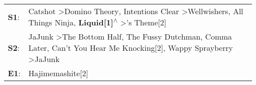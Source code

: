 \begin{supertabular}{p{0.03\textwidth}p{0.92\textwidth}}
 \textbf{S1}:  &  Catshot\textsuperscript{} \textgreater \enspace Domino Theory\textsuperscript{}, \enspace Intentions Clear\textsuperscript{} \textgreater \enspace Wellwishers\textsuperscript{}, \enspace All Things Ninja\textsuperscript{}, \enspace \textbf{Liquid[1]\textsuperscript{$\wedge$}} \textgreater {}'s Theme[2]\textsuperscript{}  \enspace  \\
 \textbf{S2}:  &               JaJunk\textsuperscript{} \textgreater \enspace The Bottom Half\textsuperscript{}, \enspace The Fussy Dutchman\textsuperscript{}, \enspace Comma Later\textsuperscript{}, \enspace Can't You Hear Me Knocking[2]\textsuperscript{}, \enspace Wappy Sprayberry\textsuperscript{} \textgreater \enspace JaJunk\textsuperscript{}  \enspace  \\
 \textbf{E1}:  &                                                                                                                                                                                                                                                                                                          Hajimemashite[2]\textsuperscript{}  \enspace  \\
\end{supertabular}
